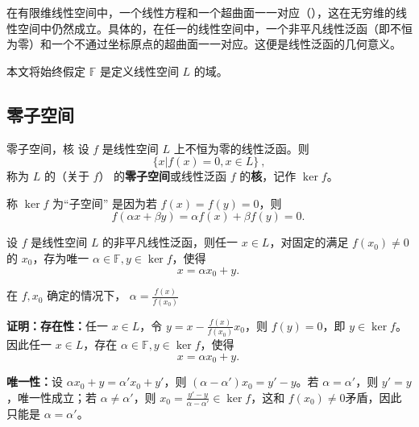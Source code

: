
在有限维线性空间中，一个线性方程和一个超曲面一一对应（），这在无穷维的线性空间中仍然成立。具体的，在任一的线性空间中，一个非平凡线性泛函（即不恒为零）和一个不通过坐标原点的超曲面一一对应。这便是线性泛函的几何意义。

本文将始终假定 $\mathbb F$ 是定义线性空间 $L$ 的域。

\subsection{零子空间}
\begin{definition}{零子空间，核}
设 $f$ 是线性空间 $L$ 上不恒为零的线性泛函。则
\begin{equation}
\{x|f(x)=0,x\in L\}~,
\end{equation}
称为 $L$ 的（关于 $f$） 的\textbf{零子空间}或线性泛函 $f$ 的\textbf{核}，记作 $\ker f$。
\end{definition}

称 $\ker f$ 为“子空间” 是因为若 $f(x)=f(y)=0$，则 
\begin{equation}
f(\alpha x+\beta y)=\alpha f(x)+\beta f(y)=0.~
\end{equation}


\begin{lemma}{}\label{lem_LiFunG_1}
设 $f$ 是线性空间 $L$ 的非平凡线性泛函，则任一 $x\in L$，对固定的满足 $f(x_0)\neq0$ 的 $x_0$，存为唯一 $\alpha\in\mathbb F,y\in \ker f$，使得
\begin{equation}
x=\alpha x_0+y.~
\end{equation}

在 $f,x_0$ 确定的情况下， $\alpha=\frac{f(x)}{f(x_0)}$
\end{lemma}

\textbf{证明：}\textbf{存在性：}任一 $x\in L$，令 $y=x-\frac{f(x)}{f(x_0)}x_0$，则 $f(y)=0$，即 $y\in\ker f$。因此任一 $x\in L$，存在 $\alpha\in\mathbb F,y\in \ker f$，使得
\begin{equation}\label{eq_LiFunG_1}
x=\alpha x_0+y.~
\end{equation}

\textbf{唯一性：}设 $\alpha x_0+y=\alpha' x_0+y'$，则 $(\alpha-\alpha')x_0=y'-y$。若 $\alpha=\alpha'$，则 $y'=y$，唯一性成立；若 $\alpha\neq\alpha'$，则 $x_0=\frac{y'-y}{\alpha-\alpha'}\in\ker f$，这和 $f(x_0)\neq0$矛盾，因此只能是 $\alpha=\alpha'$。 

